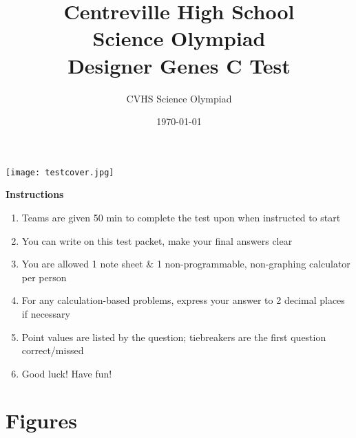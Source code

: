 \documentclass[addpoints]{exam}
\title{Centreville High School \\ Science Olympiad \\ Designer Genes C Test}
\author{CVHS Science Olympiad}
\date{\today}
\begin{document}
\maketitle

\thispagestyle{empty}

\noindent
\texttt{[image: testcover.jpg]}

\begin{center}

\textbf{\large{Instructions}}

\end{center}

\begin{enumerate}
    \item Teams are given 50 min to complete the test upon when instructed to start
    \item You can write on this test packet, make your final answers clear
    \item You are allowed 1 note sheet \& 1 non-programmable, non-graphing calculator per person
    \item For any calculation-based problems, express your answer to 2 decimal places if necessary
    \item Point values are listed by the question; tiebreakers are the first question correct/missed
    \item Good luck! Have fun! %

\end{enumerate}

\newpage

\section*{Figures}

\noindent
\end{document}
